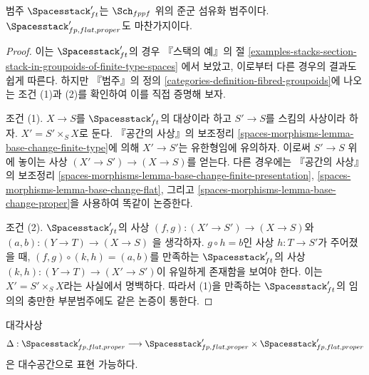 \begin{lemma}
\label{lemma-spaces-fibred-in-groupoids}
범주 $\Spacesstack'_{ft}$는 $\Sch_{fppf}$ 위의 준군 섬유화 범주이다.
$\Spacesstack'_{fp, flat, proper}$도 마찬가지이다.
\end{lemma}

\begin{proof}
이는 $\Spacesstack'_{ft}$의 경우 『스택의 예』의 절
\ref{examples-stacks-section-stack-in-groupoids-of-finite-type-spaces}
에서 보았고, 이로부터 다른 경우의 결과도 쉽게 따른다. 하지만
『범주』의 정의 \ref{categories-definition-fibred-groupoids}에 나오는
조건 (1)과 (2)를 확인하여 이를 직접 증명해 보자.

\medskip\noindent
조건 (1). $X \to S$를 $\Spacesstack'_{ft}$의 대상이라 하고 $S' \to S$를
스킴의 사상이라 하자. $X' = S' \times_S X$로 둔다. 『공간의 사상』의
보조정리
\ref{spaces-morphisms-lemma-base-change-finite-type}에 의해
$X' \to S'$는 유한형임에 유의하자. 이로써 $S' \to S$ 위에 놓이는
사상 $(X' \to S') \to (X \to S)$를 얻는다. 다른 경우에는 『공간의 사상』의
보조정리
\ref{spaces-morphisms-lemma-base-change-finite-presentation},
\ref{spaces-morphisms-lemma-base-change-flat}, 그리고
\ref{spaces-morphisms-lemma-base-change-proper}을 사용하여 똑같이 논증한다.

\medskip\noindent
조건 (2). $\Spacesstack'_{ft}$의 사상
$(f, g) : (X' \to S') \to (X \to S)$와 $(a, b) : (Y \to T) \to (X \to S)$
을 생각하자. $g \circ h = b$인 사상 $h : T \to S'$가 주어졌을 때,
$(f, g) \circ (k, h) = (a, b)$를 만족하는 $\Spacesstack'_{ft}$의 사상
$(k, h) : (Y \to T) \to (X' \to S')$이 유일하게 존재함을 보여야 한다.
이는 $X' = S' \times_S X$라는 사실에서 명백하다. 따라서 (1)을 만족하는
$\Spacesstack'_{ft}$의 임의의 충만한 부분범주에도 같은 논증이 통한다.
\end{proof}

\begin{lemma}
\label{lemma-spaces-diagonal}
대각사상
$$
\Delta : \Spacesstack'_{fp, flat, proper} \longrightarrow
\Spacesstack'_{fp, flat, proper} \times \Spacesstack'_{fp, flat, proper}
$$
은 대수공간으로 표현 가능하다.
\end{lemma}


